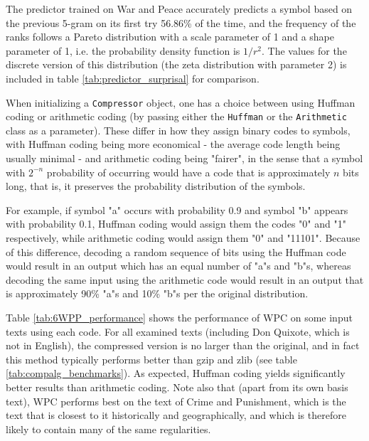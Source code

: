 The predictor trained on War and Peace accurately predicts a symbol based on the previous 5-gram on its first try 56.86\% of the time, and the frequency of the ranks follows a Pareto distribution with a scale parameter of 1 and a shape parameter of 1, i.e. the probability density function is $1/r^2$. The values for the discrete version of this distribution (the zeta distribution with parameter 2) is included in table \ref{tab:predictor_surprisal} for comparison.

When initializing a \texttt{Compressor} object, one has a choice between using Huffman coding or arithmetic coding (by passing either the \texttt{Huffman} or the \texttt{Arithmetic} class as a parameter). These differ in how they assign binary codes to symbols, with Huffman coding being more economical - the average code length being usually minimal - and arithmetic coding being "fairer", in the sense that a symbol with $2^{-n}$ probability of occurring would have a code that is approximately $n$ bits long, that is, it preserves the probability distribution of the symbols.

For example, if symbol "a" occurs with probability 0.9 and symbol "b" appears with probability 0.1, Huffman coding would assign them the codes "0" and "1" respectively, while arithmetic coding would assign them "0" and "11101". Because of this difference, decoding a random sequence of bits using the Huffman code would result in an output which has an equal number of "a"s and "b"s, whereas decoding the same input using the arithmetic code would result in an output that is approximately 90\% "a"s and 10\% "b"s per the original distribution.

Table \ref{tab:6WPP_performance} shows the performance of WPC on some input texts using each code. For all examined texts (including Don Quixote, which is not in English), the compressed version is no larger than the original, and in fact this method typically performs better than gzip and zlib (see table \ref{tab:compalg_benchmarks}). As expected, Huffman coding yields significantly better results than arithmetic coding. Note also that (apart from its own basis text), WPC performs best on the text of Crime and Punishment, which is the text that is closest to it historically and geographically, and which is therefore likely to contain many of the same regularities.

